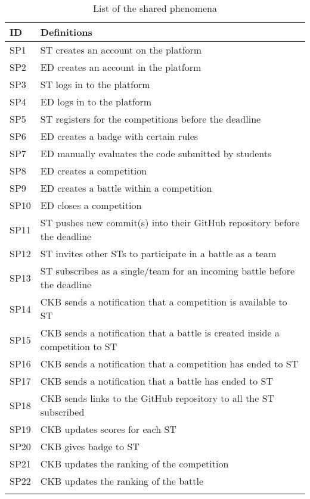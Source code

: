 \begin{longtable}{|l|l|}

  \hline
  \textbf{ID} & \textbf{Definitions}      \\
  \hline
  SP1 & ST creates an account on the platform \\
  \hline
  SP2 & ED creates an account in the platform \\
  \hline
  SP3 & ST logs in to the platform \\
  \hline
  SP4 & ED logs in to the platform  \\
  \hline
  SP5 & ST registers for the competitions before the deadline   \\
  \hline
  SP6 & ED creates a badge with certain rules   \\
  \hline
  SP7 & ED manually evaluates the code submitted by students   \\
  \hline
  SP8 & ED creates a competition   \\
  \hline
  SP9 & ED creates a battle within a competition   \\
  \hline
  SP10 & ED closes a competition   \\
  \hline
  SP11 & ST pushes new commit(s) into their GitHub repository before the deadline   \\
  \hline
  SP12 & ST invites other STs to participate in a battle as a team   \\
  \hline
  SP13 & ST subscribes as a single/team for an incoming battle before the deadline   \\
  \hline
  SP14 & CKB sends a notification that a competition is available to ST   \\
  \hline
  SP15 & CKB sends a notification that a battle is created inside a competition to ST   \\
  \hline
  SP16 & CKB sends a notification that a competition has ended to ST   \\
  \hline
  SP17 & CKB sends a notification that a battle has ended to ST   \\
  \hline
  SP18 & CKB sends links to the GitHub repository to all the ST subscribed   \\
  \hline
  SP19 & CKB updates scores for each ST   \\
  \hline
  SP20 & CKB gives badge to ST   \\
  \hline
  SP21 & CKB updates the ranking of the competition   \\
  \hline
  SP22 & CKB updates the ranking of the battle   \\
  \hline
  
  \caption{List of the shared phenomena}
  \label{tab:sharedPhenomena}
\end{longtable}


